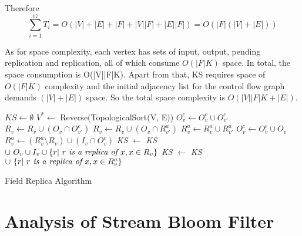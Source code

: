 Therefore 
\begin{displaymath}
\sum_{i=1}^{17}T_{i}= O(|V|+|E|+|F|+|V||F|+|E||F|) =O(|F|(|V|+|E|))
\end{displaymath}


As for space complexity, each vertex has sets of input, output, pending replication and replication, all of which consume $O(|F|K)$ space. In total, the space consumption is O(|V||F|K). Apart from that, KS requires space of $O(|F|K)$ complexity and the initial adjacency list for the control flow graph demands $(|V|+|E|)$ space. So the total space complexity is $O(|V||F|K+|E|)$.

\begin{algorithm}[!t]
\LinesNumbered
{}
$KS \leftarrow \emptyset$ \;
$ V^{*} \leftarrow $ Reverse(TopologicalSort(V, E)) \;
 {
     {
    	$O^c_v \leftarrow O^c_v \cup O^c_{v'}$ \;
    	$ R_v \leftarrow R_v \cup ( O_v \cap O^c_{v'} ) $ \;
    	$ R_v \leftarrow R_v \cup ( O_v \cap R_{v'}^a )$ \;
        $ R^a_v \leftarrow R^a_v \cup R^a_{v'}  $ \;
    }    
	$O^c_v \leftarrow O^c_v \cup O_v $ \;
    $R^a_v \leftarrow (R^a_v \setminus R_v) \cup (I_v \cap O^c_v) $ \;
    \textit{KS} $\leftarrow$ \textit{KS} $ \cup \ O_v \cup I_v \cup \{r|\ \text{\textit{$r$ is a replica of $x$}}, x \in R_v\} $\;
     {
    	\textit{KS} $\leftarrow$ \textit{KS} $ \cup \ \{r|\ \text{\textit{$r$ is a replica of $x$}}, x \in R^a_v\}  $\;
    }
}
\;
\caption{Field Replica Algorithm}
\label{alg:field-replica}
\end{algorithm}




\section{Analysis of Stream Bloom Filter}

\newcommand{\Y}{{\color{red}$\checkmark$}}
\newcommand{\N}{{\color{green}\textbf{$\times$}}}

